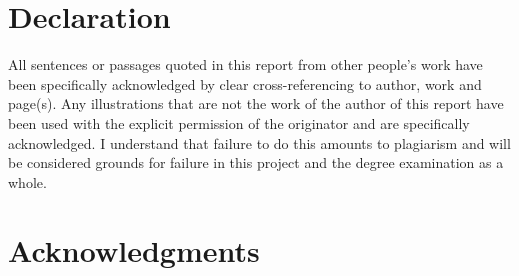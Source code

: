 \documentclass[a4paper,11pt,titlepage,openright]{report}
\begin{document}


\chapter*{Declaration}
All sentences or passages quoted in this report from other people's work have been specifically acknowledged by clear cross-referencing to author, work and page(s). Any illustrations that are not the work of the author of this report have been used with the explicit permission of the originator and are specifically acknowledged. I understand that failure to do this amounts to plagiarism and will be considered grounds for failure in this project and the degree examination as a whole.

\chapter*{Acknowledgments}
\tableofcontents
\cleardoublepage{}






\end{document}
